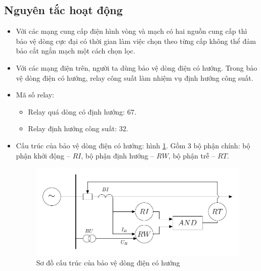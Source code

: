 \documentclass[12pt,a4paper]{article}
\begin{document}
\subsection{Nguyên tắc hoạt động}
	\begin{itemize}
		\item Với các mạng cung cấp điện hình vòng và mạch có hai nguồn cung cấp thì bảo vệ dòng cực đại có thời gian làm việc chọn theo từng cấp không thể đảm bảo cắt ngắn mạch một cách chọn lọc.
		
		\item Với các mạng điện trên, người ta dùng bảo vệ dòng điện có hướng. Trong bảo vệ dòng điện có hướng, relay công suất làm nhiệm vụ định hướng công suất.
		
		\item Mã số relay:
			\begin{itemize}
				\item Relay quá dòng có định hướng: $67$.
				
				\item Relay định hướng công suất: $32$.
			\end{itemize}
		
		\item Cấu trúc của bảo vệ dòng điện có hướng: hình \ref{Fig:sodocautruc-bvdongdiencohuong}. Gồm 3 bộ phận chính: bộ phận khởi động -- $RI$, bộ phận định hướng -- $RW$, bộ phận trễ -- $RT$.
			\begin{figure}[!h]
				\begin{center}					
					\includegraphics[scale=1]{diagram-draw-tikz/Figure-cautruc-baove-dongdiencohuong.pdf} 
				\end{center}
				\caption{Sơ đồ cấu trúc của bảo vệ dòng điện có hướng} \label{Fig:sodocautruc-bvdongdiencohuong}
			\end{figure}


\end{itemize}
\end{document}
